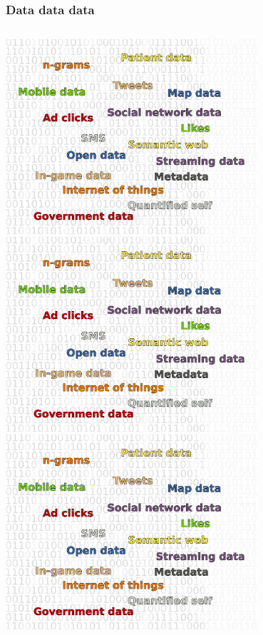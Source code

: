 
\begin{frame}
\frametitle{Data data data}

\begin{center}

\begin{columns}

\begin{column}{0.5\textwidth}
\begin{center}
\includegraphics[width=0.7\textwidth]{graphics/data_cloud2.pdf}\\
\includegraphics[width=0.7\textwidth]{graphics/data_cloud2.pdf}\\
\bigskip
\includegraphics[width=0.7\textwidth]{graphics/data_cloud2.pdf}
\end{center}
\end{column}


\end{columns}
\end{center}
\end{frame}
